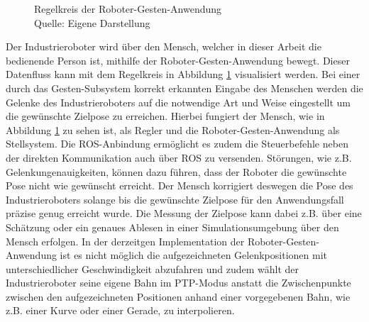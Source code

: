 \begin{figure}[!h]
\newline
    \caption[Regelkreis der Roboter-Gesten-Anwendung]{Regelkreis der Roboter-Gesten-Anwendung\\Quelle: Eigene Darstellung}
    \label{fig:regelkreis_tir}
\end{figure}\FloatBarrier

Der Industrieroboter wird über den Mensch, welcher in dieser Arbeit die bedienende Person ist, mithilfe der Roboter-Gesten-Anwendung bewegt. Dieser Datenfluss kann mit dem Regelkreis in Abbildung \ref{fig:regelkreis_tir} visualisiert werden. Bei einer durch das Gesten-Subsystem korrekt erkannten Eingabe des Menschen werden die Gelenke des Industrieroboters auf die notwendige Art und Weise eingestellt um die gewünschte Zielpose zu erreichen. Hierbei fungiert der Mensch, wie in Abbildung \ref{fig:regelkreis_tir} zu sehen ist, als Regler und die Roboter-Gesten-Anwendung als Stellsystem. Die ROS-Anbindung ermöglicht es zudem die Steuerbefehle neben der direkten Kommunikation auch über ROS zu versenden. Störungen, wie z.B. Gelenkungenauigkeiten, können dazu führen, dass der Roboter die gewünschte Pose nicht wie gewünscht erreicht. Der Mensch korrigiert deswegen die Pose des Industrieroboters solange bis die gewünschte Zielpose für den Anwendungsfall präzise genug erreicht wurde. Die Messung der Zielpose kann dabei z.B. über eine Schätzung oder ein genaues Ablesen in einer Simulationsumgebung über den Mensch erfolgen. In der derzeitgen Implementation der Roboter-Gesten-Anwendung ist es nicht möglich die aufgezeichneten Gelenkpositionen mit unterschiedlicher Geschwindigkeit abzufahren und zudem wählt der Industrieroboter seine eigene Bahn im PTP-Modus anstatt die Zwischenpunkte zwischen den aufgezeichneten Positionen anhand einer vorgegebenen Bahn, wie z.B. einer Kurve oder einer Gerade, zu interpolieren.

